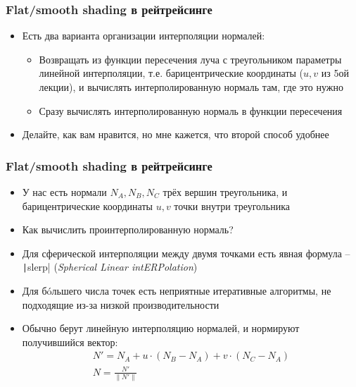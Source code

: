 \documentclass[10pt]{beamer}
\begin{document}
\begin{frame}
\frametitle{Flat/smooth shading в рейтрейсинге}
\begin{itemize}
\item Есть два варианта организации интерполяции нормалей:
\pause
\begin{itemize}
\item Возвращать из функции пересечения луча с треугольником параметры линейной интерполяции, т.е. барицентрические координаты (\begin{math}u, v\end{math} из 5ой лекции), и вычислять интерполированную нормаль там, где это нужно
\pause
\item Сразу вычислять интерполированную нормаль в функции пересечения
\end{itemize}
\pause
\item Делайте, как вам нравится, но мне кажется, что второй способ удобнее
\end{itemize}
\end{frame}

\begin{frame}
\frametitle{Flat/smooth shading в рейтрейсинге}
\begin{itemize}
\item У нас есть нормали \begin{math}N_A,N_B,N_C\end{math} трёх вершин треугольника, и барицентрические координаты \begin{math}u,v\end{math} точки внутри треугольника
\pause
\item Как вычислить проинтерполированную нормаль?
\pause
\item Для сферической интерполяции между двумя точками есть явная формула -- \texttt|slerp| (\textit{Spherical Linear intERPolation})
\pause
\item Для бóльшего числа точек есть неприятные итеративные алгоритмы, не подходящие из-за низкой производительности
\pause
\item Обычно берут линейную интерполяцию нормалей, и нормируют получившийся вектор:
\begin{gather*}
N' = N_A + u\cdot (N_B - N_A) + v \cdot (N_C - N_A) \\
N = \frac{N'}{\|N'\|}
\end{gather*}
\end{itemize}
\end{frame}
\end{document}
